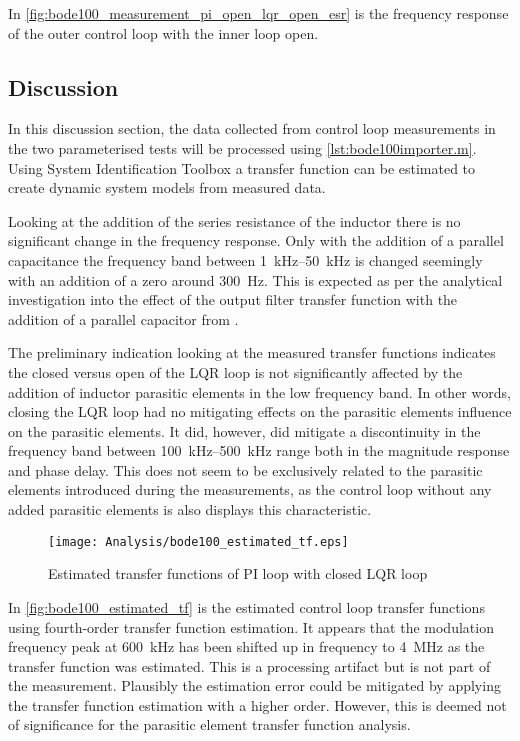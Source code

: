In \autoref{fig:bode100_measurement_pi_open_lqr_open_esr} is the frequency response of the outer control loop with the inner loop open.

\subsection{Discussion}
In this discussion section, the data collected from control loop measurements in the two parameterised tests will be processed using \autoref{lst:bode100importer.m}. Using System Identification Toolbox \cite{matlab_sysident_toolbox} a transfer function can be estimated to create dynamic system models from measured data. 

Looking at the addition of the series resistance of the inductor there is no significant change in the frequency response. Only with the addition of a parallel capacitance the frequency band between \SIrange{1}{50}{\kilo\hertz} is changed seemingly with an addition of a zero around \SI{300}{\hertz}. This is expected as per the analytical investigation into the effect of the output filter transfer function with the addition of a parallel capacitor from .

The preliminary indication looking at the measured transfer functions  indicates the closed versus open of the LQR loop is not significantly affected by the addition of inductor parasitic elements in the low frequency band. In other words, closing the LQR loop had no mitigating effects on the parasitic elements influence on the parasitic elements. It did, however, did mitigate a discontinuity in the frequency band between \SIrange[scientific-notation = engineering]{100}{500}{\kilo\hertz} range both in the magnitude response and phase delay. This does not seem to be exclusively related to the parasitic elements introduced during the measurements, as the control loop without any added parasitic elements is also displays this characteristic.

\begin{figure}[htbp]
	\centering
	\texttt{[image: Analysis/bode100\_estimated\_tf.eps]}
	\caption{Estimated transfer functions of PI loop with closed LQR loop}
	\label{fig:bode100_estimated_tf}
\end{figure}
In \autoref{fig:bode100_estimated_tf} is the estimated control loop transfer functions using fourth-order transfer function estimation. It appears that the modulation frequency peak at \SI{600}{\kilo\hertz} has been shifted up in frequency to \SI{4}{\mega\hertz} as the transfer function was estimated. This is a processing artifact but is not part of the measurement. Plausibly the estimation error could be mitigated by applying the transfer function estimation with a higher order. However, this is deemed not of significance for the parasitic element transfer function analysis.

